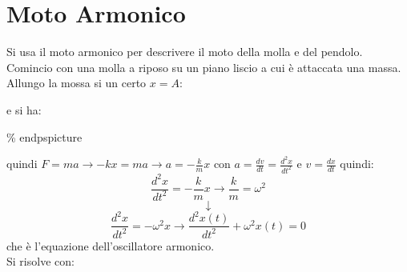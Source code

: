 \documentclass[a4paper,12pt, oneside]{book}
\begin{document}
\chapter{Moto Armonico}
Si usa il moto armonico per descrivere il moto della molla e del pendolo.
Comincio con una molla a riposo su un piano liscio a cui è attaccata una massa. Allungo la mossa si un certo $x=A$:
\begin{center}
\end{center}
e si ha:
\begin{center}
	\% end{pspicture}
\end{center}
quindi $F=ma\to -kx=ma\to a=-\frac{k}{m}x$ con $a=\frac{dv}{dt}=\frac{d^2x}{dt^2}$ e $v=\frac{dx}{dt}$ quindi:
$$\frac{d^2x}{dt^2}=-\frac{k}{m}x\to \frac{k}{m}=\omega^2$$
$$\downarrow$$
$$\frac{d^2x}{dt^2}=-\omega^2 x \to \frac{d^2x(t)}{dt^2}+\omega^2x(t)=0$$
che è l'equazione dell'oscillatore armonico.\\
Si risolve con:
\end{document}
